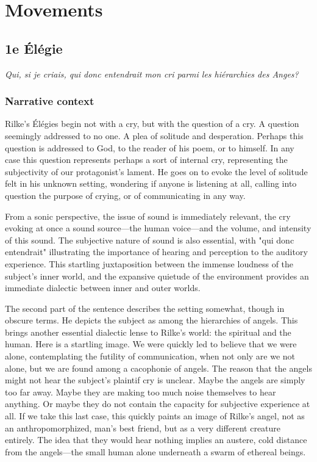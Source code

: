 \documentclass[12pt,twoside,maitrise]{dms}
\theoremstyle{definition}
\begin{document}
\section{Movements}
\anglais
\subsection{1e Élégie}

\epigraph{\textit{Qui, si je criais, qui donc entendrait mon cri parmi les hiérarchies des Anges?}}{}

\subsubsection{Narrative context}
Rilke's Élégies begin not with a cry, but with the question of a cry. A question seemingly addressed to no one. A plea of solitude and desperation. Perhaps this question is addressed to God, to the reader of his poem, or to himself. In any case this question represents perhaps a sort of internal cry, representing the subjectivity of our protagonist's lament. He goes on to evoke the level of solitude felt in his unknown setting, wondering if anyone is listening at all, calling into question the purpose of crying, or of communicating in any way.

From a sonic perspective, the issue of sound is immediately relevant, the cry evoking at once a sound source---the human voice---and the volume, and intensity of this sound. The subjective nature of sound is also essential, with "qui donc entendrait" illustrating the importance of hearing and perception to the auditory experience. This startling juxtaposition between the immense loudness of the subject's inner world, and the expansive quietude of the environment provides an immediate dialectic between inner and outer worlds.

The second part of the sentence describes the setting somewhat, though in obscure terms. He depicts the subject as among the hierarchies of angels. This brings another essential dialectic lense to Rilke's world: the spiritual and the human. Here is a startling image. We were quickly led to believe that we were alone, contemplating the futility of communication, when not only are we not alone, but we are found among a cacophonie of angels. The reason that the angels might not hear the subject's plaintif cry is unclear. Maybe the angels are simply too far away. Maybe they are making too much noise themselves to hear anything. Or maybe they do not contain the capacity for subjective experience at all. If we take this last case, this quickly paints an image of Rilke's angel, not as an anthropomorphized, man's best friend, but as a very different creature entirely. The idea that they would hear nothing implies an austere, cold distance from the angels---the small human alone underneath a swarm of ethereal beings.
\end{document}
